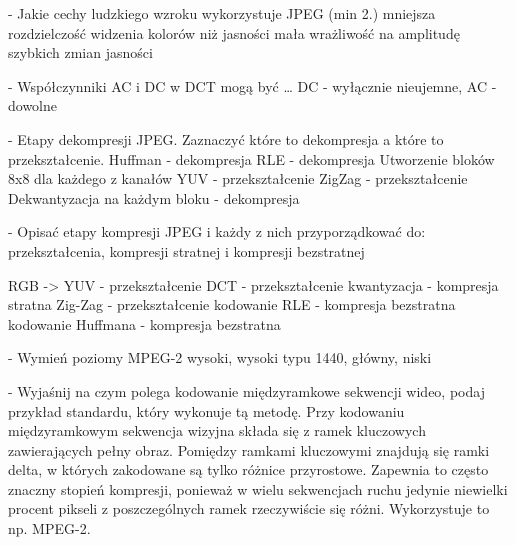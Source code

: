 \documentclass[a4paper, 12pt, titlepage]{article}
\begin{document}
- Jakie cechy ludzkiego wzroku wykorzystuje JPEG (min 2.)
mniejsza rozdzielczość widzenia kolorów niż jasności
mała wrażliwość na amplitudę szybkich zmian jasności

- Współczynniki AC i DC w DCT mogą być …
DC - wyłącznie nieujemne,
AC - dowolne


- Etapy dekompresji JPEG. Zaznaczyć które to dekompresja a które to przekształcenie.
Huffman - dekompresja
RLE - dekompresja
Utworzenie bloków 8x8 dla każdego z kanałów YUV - przekształcenie
ZigZag - przekształcenie
Dekwantyzacja na każdym bloku - dekompresja


- Opisać etapy kompresji JPEG i każdy z nich przyporządkować do: przekształcenia, kompresji stratnej i kompresji bezstratnej

RGB -> YUV - przekształcenie
DCT - przekształcenie
kwantyzacja - kompresja stratna
Zig-Zag - przekształcenie
kodowanie RLE - kompresja bezstratna
kodowanie Huffmana - kompresja bezstratna

- Wymień poziomy MPEG-2 
wysoki, wysoki typu 1440,  główny,  niski

- Wyjaśnij na czym polega kodowanie międzyramkowe sekwencji wideo, podaj przykład standardu, który wykonuje tą metodę. 
Przy kodowaniu międzyramkowym sekwencja wizyjna składa się z ramek kluczowych zawierających pełny obraz. Pomiędzy ramkami kluczowymi znajdują się ramki delta, w których zakodowane są tylko różnice przyrostowe. Zapewnia to często znaczny stopień kompresji, ponieważ w wielu sekwencjach ruchu jedynie niewielki procent pikseli z poszczególnych ramek rzeczywiście się różni. Wykorzystuje to np. MPEG-2.

\end{document}
